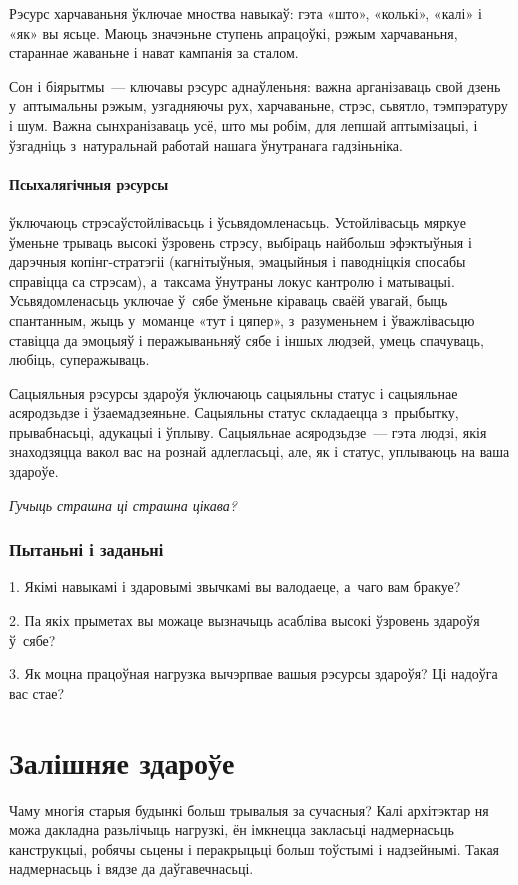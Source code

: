 Рэсурс харчаваньня ўключае мноства навыкаў: гэта «што», «колькі», «калі» і «як» вы ясьце. Маюць значэньне ступень апрацоўкі, рэжым харчаваньня, стараннае жаваньне і нават кампанія за сталом.

Сон і біярытмы~--- ключавы рэсурс аднаўленьня: важна арганізаваць свой дзень у~аптымальны рэжым, узгадняючы рух, харчаваньне, стрэс, сьвятло, тэмпэратуру і шум. Важна сынхранізаваць усё, што мы робім, для лепшай аптымізацыі, і ўзгадніць з~натуральнай работай нашага ўнутранага гадзіньніка.

\paragraph{Псыхалягічныя рэсурсы} ўключаюць стрэсаўстойлівасьць і ўсьвядомленасьць. Устойлівасьць мяркуе ўменьне трываць высокі ўзровень стрэсу, выбіраць найбольш эфэктыўныя і дарэчныя копінг-стратэгіі (кагнітыўныя, эмацыйныя і паводніцкія спосабы справіцца са стрэсам), а~таксама ўнутраны локус кантролю і матывацыі. Усьвядомленасьць уключае ў~сябе ўменьне кіраваць сваёй увагай, быць спантанным, жыць у~моманце «тут і цяпер», з~разуменьнем і ўважлівасьцю ставіцца да эмоцыяў і перажываньняў сябе і іншых людзей, умець спачуваць, любіць, суперажываць.

Сацыяльныя рэсурсы здароўя ўключаюць сацыяльны статус і сацыяльнае асяродзьдзе і ўзаемадзеяньне. Сацыяльны статус складаецца з~прыбытку, прывабнасьці, адукацыі і ўплыву. Сацыяльнае асяродзьдзе~--- гэта людзі, якія знаходзяцца вакол вас на рознай адлегласьці, але, як і статус, уплываюць на ваша здароўе. 

\emph{Гучыць страшна ці страшна цікава?}


\subsubsection{Пытаньні і заданьні}

1. Якімі навыкамі і здаровымі звычкамі вы валодаеце, а~чаго вам бракуе?

2. Па якіх прыметах вы можаце вызначыць асабліва высокі ўзровень здароўя ў~сябе?

3. Як моцна працоўная нагрузка вычэрпвае вашыя рэсурсы здароўя? Ці надоўга вас стае?


\section{Залішняе здароўе}


Чаму многія старыя будынкі больш трывалыя за сучасныя? Калі архітэктар ня можа дакладна разьлічыць нагрузкі, ён імкнецца закласьці надмернасьць канструкцыі, робячы сьцены і перакрыцьці больш тоўстымі і надзейнымі. Такая надмернасьць і вядзе да даўгавечнасьці.

